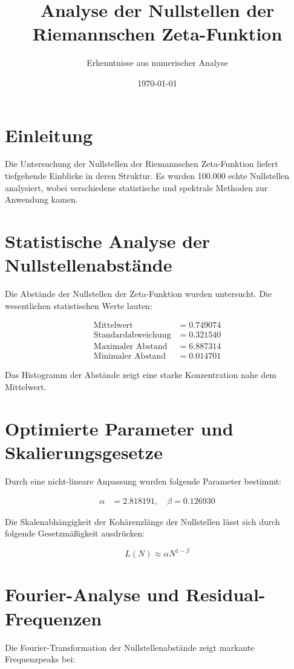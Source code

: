 \documentclass[a4paper,12pt]{article}
\title{Analyse der Nullstellen der Riemannschen Zeta-Funktion}
\author{Erkenntnisse aus numerischer Analyse}
\date{\today}
\begin{document}
\maketitle

\section{Einleitung}
Die Untersuchung der Nullstellen der Riemannschen Zeta-Funktion liefert tiefgehende Einblicke in deren Struktur. 
Es wurden 100.000 echte Nullstellen analysiert, wobei verschiedene statistische und spektrale Methoden zur Anwendung kamen.

\section{Statistische Analyse der Nullstellenabstände}
Die Abstände der Nullstellen der Zeta-Funktion wurden untersucht. Die wesentlichen statistischen Werte lauten:

\begin{align}
\text{Mittelwert} &= 0.749074 \\
\text{Standardabweichung} &= 0.321540 \\
\text{Maximaler Abstand} &= 6.887314 \\
\text{Minimaler Abstand} &= 0.014701
\end{align}

Das Histogramm der Abstände zeigt eine starke Konzentration nahe dem Mittelwert.

\section{Optimierte Parameter und Skalierungsgesetze}
Durch eine nicht-lineare Anpassung wurden folgende Parameter bestimmt:

\begin{align}
\alpha &= 2.818191, \quad \beta = 0.126930
\end{align}

Die Skalenabhängigkeit der Kohärenzlänge der Nullstellen lässt sich durch folgende Gesetzmäßigkeit ausdrücken:

\begin{equation}
L(N) \approx \alpha N^{1-\beta}
\end{equation}

\section{Fourier-Analyse und Residual-Frequenzen}
Die Fourier-Transformation der Nullstellenabstände zeigt markante Frequenzpeaks bei:
\end{document}
